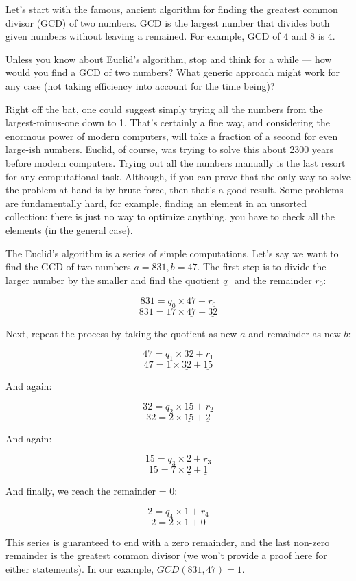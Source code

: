 \documentclass[a4paper, justified, notitlepage, sfsidenotes, notoc]{tufte-book}
\begin{document}
Let's start with the famous, ancient algorithm for finding the greatest common divisor (GCD) of two numbers. GCD is the largest number that divides both given numbers without leaving a remained. For example, GCD of 4 and 8 is 4.

Unless you know about Euclid's algorithm, stop and think for a while — how would you find a GCD of two numbers? What generic approach might work for any case (not taking efficiency into account for the time being)?

Right off the bat, one could suggest simply trying all the numbers from the largest-minus-one down to 1. That's certainly a fine way, and considering the enormous power of modern computers, will take a fraction of a second for even large-ish numbers. Euclid, of course, was trying to solve this about 2300 years before modern computers. Trying out all the numbers manually is the last resort for any computational task. Although, if you can prove that the only way to solve the problem at hand is by brute force, then that's a good result. Some problems are fundamentally hard, for example, finding an element in an unsorted collection: there is just no way to optimize anything, you have to check all the elements (in the general case).

The Euclid's algorithm is a series of simple computations. Let's say we want to find the GCD of two numbers \(a = 831, b = 47\). The first step is to divide the larger number by the smaller and find the quotient \(q_{0}\) and the remainder \(r_{0}\):

$$831 = q_{0} \times 47 + r_{0}$$
$$831 = 17 \times \underline{47} + \underline{32}$$

Next, repeat the process by taking the quotient as new \(a\) and remainder as new \(b\):

$$47 = q_{1} \times 32 + r_{1}$$
$$47 = 1 \times \underline{32} + \underline{15}$$

And again:

$$32 = q_{2} \times 15 + r_{2}$$
$$32 = 2 \times \underline{15} + \underline{2}$$

And again:

$$15 = q_{3} \times 2 + r_{3}$$
$$15 = 7 \times \underline{2} + \underline{1}$$

And finally, we reach the remainder = \(0\):

$$2 = q_{4} \times 1 + r_{4}$$
$$2 = 2 \times 1 + 0$$

This series is guaranteed to end with a zero remainder, and the last non-zero remainder is the greatest common divisor (we won't provide a proof here for either statements). In our example, \(GCD(831, 47) = 1\).
\end{document}
